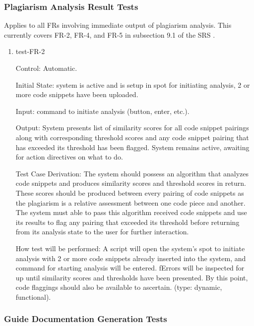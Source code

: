 \documentclass[12pt, titlepage]{article}
\begin{document}
\subsubsection{Plagiarism Analysis Result Tests}

Applies to all FRs involving immediate output of plagiarism analysis. This 
currently covers FR-2, FR-4, and FR-5 in subsection 9.1 of the SRS \citep{SRS}.

\begin{enumerate}

\item{test-FR-2\\}

Control: Automatic.
					
Initial State: system is active and is setup in spot for initiating analysis, 
2 or more code snippets have been uploaded.
					
Input: command to initiate analysis (button, enter, etc.).
					
Output: System presents list of similarity scores for all code snippet pairings 
along  with corresponding threshold scores and any code snippet pairing that 
has exceeded its threshold has been flagged. System remains active, 
awaiting for action directives on what to do.

Test Case Derivation: The system should possess an algorithm that analyzes code 
snippets and produces similarity scores and threshold scores in return. These 
scores should be produced between every pairing of code snippets as the 
plagiarism is a relative assessment between one code piece and another. The 
system must able to pass this algorithm received code snippets and use its
results to flag any pairing that exceeded its threshold before returning from
its analysis state to the user for further interaction.

How test will be performed: A script will open the system's spot to initiate analysis 
with 2 or more code snippets already inserted into the system, and command for 
starting analysis will be entered. fErrors will be inspected for 
up until similarity scores and thresholds have been presented. By this point,
code flaggings should also be available to ascertain. (type: dynamic, functional).
					

\end{enumerate}

\subsubsection{Guide Documentation Generation Tests}
\end{document}
